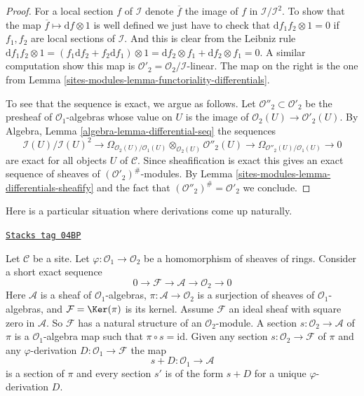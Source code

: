 \begin{proof}
For a local section $f$ of $\mathcal{I}$ denote $\overline{f}$ the image of
$f$ in $\mathcal{I}/\mathcal{I}^2$. To show that the map
$\overline{f} \mapsto \text{d}f \otimes 1$ is well defined we just have to
check that $\text{d} f_1f_2 \otimes 1 = 0$ if $f_1, f_2$ are local sections
of $\mathcal{I}$. And this is clear from the Leibniz rule
$\text{d} f_1f_2 \otimes 1 =
(f_1 \text{d}f_2 + f_2 \text{d} f_1 )\otimes 1 =
\text{d}f_2 \otimes f_1 + \text{d}f_2 \otimes f_1 = 0$.
A similar computation show this map is
$\mathcal{O}'_2 = \mathcal{O}_2/\mathcal{I}$-linear. The map on the right
is the one from Lemma \ref{sites-modules-lemma-functoriality-differentials}.

\medskip\noindent
To see that the sequence is exact, we argue as follows. Let
$\mathcal{O}''_2 \subset \mathcal{O}'_2$ be the presheaf of
$\mathcal{O}_1$-algebras whose value on $U$ is the image of
$\mathcal{O}_2(U) \to \mathcal{O}'_2(U)$. By
Algebra, Lemma \ref{algebra-lemma-differential-seq}
the sequences
$$
\mathcal{I}(U)/\mathcal{I}(U)^2
\longrightarrow
\Omega_{\mathcal{O}_2(U)/\mathcal{O}_1(U)}
\otimes_{\mathcal{O}_2(U)} \mathcal{O}''_2(U)
\longrightarrow
\Omega_{\mathcal{O}''_2(U)/\mathcal{O}_1(U)}
\longrightarrow
0
$$
are exact for all objects $U$ of $\mathcal{C}$. Since sheafification is
exact this gives an exact sequence of sheaves of
$(\mathcal{O}'_2)^\#$-modules.
By Lemma \ref{sites-modules-lemma-differentials-sheafify}
and the fact that $(\mathcal{O}''_2)^\# = \mathcal{O}'_2$
we conclude.
\end{proof}

Here is a particular situation where derivations come up
naturally.

\begin{lemma}
\label{sites-modules-lemma-double-structure-gives-derivation}
\href{https://stacks.math.columbia.edu/tag/04BP}{\texttt{Stacks tag 04BP}}

Let $\mathcal{C}$ be a site. Let $\varphi : \mathcal{O}_1 \to \mathcal{O}_2$
be a homomorphism of sheaves of rings.
Consider a short exact sequence
$$
0 \to \mathcal{F} \to \mathcal{A} \to \mathcal{O}_2 \to 0
$$
Here $\mathcal{A}$ is a sheaf of $\mathcal{O}_1$-algebras,
$\pi : \mathcal{A} \to \mathcal{O}_2$ is a surjection
of sheaves of $\mathcal{O}_1$-algebras, and
$\mathcal{F} = \Ker(\pi)$ is its kernel. Assume $\mathcal{F}$ an ideal
sheaf with square zero in $\mathcal{A}$. So $\mathcal{F}$
has a natural structure of an $\mathcal{O}_2$-module.
A section $s : \mathcal{O}_2 \to \mathcal{A}$ of $\pi$
is a $\mathcal{O}_1$-algebra map such that $\pi \circ s = \text{id}$.
Given any section $s : \mathcal{O}_2 \to \mathcal{F}$
of $\pi$ and any $\varphi$-derivation $D : \mathcal{O}_1 \to \mathcal{F}$
the map
$$
s + D : \mathcal{O}_1 \to \mathcal{A}
$$
is a section of $\pi$ and every section $s'$ is of the form $s + D$
for a unique $\varphi$-derivation $D$.
\end{lemma}

